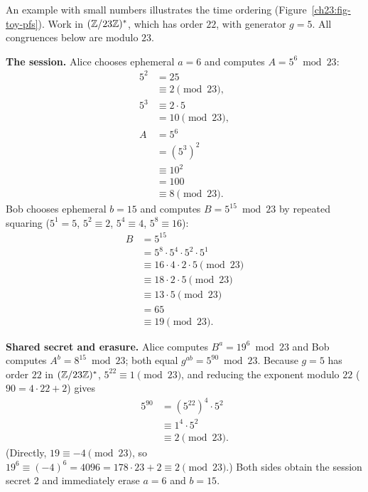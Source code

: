 An example with small numbers illustrates the time ordering (Figure~\ref{ch23:fig-toy-pfs}).
Work in $(\mathbb{Z}/23\mathbb{Z})^{*}$, which has order $22$, with generator $g=5$. All congruences
below are modulo $23$.

\textbf{The session.} Alice chooses ephemeral $a=6$ and computes $A = 5^6 \bmod 23$:
\begin{align*}
  5^2 &= 25 \\
      &\equiv 2 \pmod{23}, \\
  5^3 &\equiv 2 \cdot 5 \\
      &= 10 \pmod{23}, \\
  A &= 5^6 \\
    &= (5^3)^2 \\
    &\equiv 10^2 \\
    &= 100 \\
    &\equiv 8 \pmod{23}.
\end{align*}
Bob chooses ephemeral $b=15$ and computes $B = 5^{15} \bmod 23$ by repeated squaring
($5^1 = 5$, $5^2 \equiv 2$, $5^4 \equiv 4$, $5^8 \equiv 16$):
\begin{align*}
  B &= 5^{15} \\
    &= 5^8 \cdot 5^4 \cdot 5^2 \cdot 5^1 \\
    &\equiv 16 \cdot 4 \cdot 2 \cdot 5 \pmod{23} \\
    &\equiv 18 \cdot 2 \cdot 5 \pmod{23} \\
    &\equiv 13 \cdot 5 \pmod{23} \\
    &= 65 \\
    &\equiv 19 \pmod{23}.
\end{align*}

\textbf{Shared secret and erasure.} Alice computes $B^a = 19^6 \bmod 23$ and Bob
computes $A^b = 8^{15} \bmod 23$; both equal $g^{ab} = 5^{90} \bmod 23$. Because
$g=5$ has order $22$ in $(\mathbb{Z}/23\mathbb{Z})^{*}$, $5^{22} \equiv 1 \pmod{23}$, and reducing
the exponent modulo $22$ ($90 = 4\cdot 22 + 2$) gives
\begin{align*}
  5^{90} &= (5^{22})^4 \cdot 5^2 \\
         &\equiv 1^4 \cdot 5^2 \\
         &\equiv 2 \pmod{23}.
\end{align*}
(Directly, $19 \equiv -4 \pmod{23}$, so $19^6 \equiv (-4)^6 = 4096 = 178\cdot 23 + 2 \equiv 2 \pmod{23}$.)
Both sides obtain the session secret $2$ and immediately erase $a=6$ and $b=15$.

